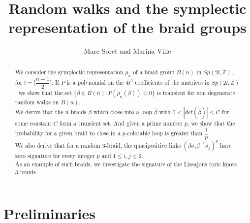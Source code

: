 \documentclass[12pt]{article}
\begin{document}
\newtheorem{defn}{Definition}
\newtheorem{fact}{Fact}
\newtheorem{thm}{Theorem}
\newtheorem{prop}{Proposition}
\newtheorem{lem}{Lemma}
\newtheorem{conj}{Conjecture}
\newtheorem{slem}{Sublemma}
\newtheorem{cor}{Corollary}
\newtheorem{ass}{Assumption}
\newtheorem{ques}{Question}
\newtheorem*{mlem*}{Main Lemma}

\newcommand{\newconstant}[2]{\refstepcounter{constant}\label{#1}}
\newcommand{\useconstant}[2]{C_{\ref{#1}}}
\title{Random walks and the symplectic representation of the braid groups}
\author{Marc Soret and Marina Ville}
\maketitle
\begin{abstract} We consider the symplectic representation $\rho_n$ of a braid group $B(n)$ in $Sp(2l,\mathbb{Z})$, for $l=\Big[\dfrac{n-1}{2}\Big]$. If $P$ is a  polynomial on the $4l^2$ coefficients of the matrices in $Sp(2l,\mathbb{Z})$, we show that the set $\{\beta\in B(n): P(\rho_n(\beta))=0\}$ is transient for non degenerate random walks on $B(n)$. \\
	We derive that the $n$-braids $\beta$ which close into a loop $\hat{\beta}$ with  $0<|det({\hat{\beta}})|\leq C$ for some constant $C$ form a transient set. And given a prime number $p$, we show that the probability for a given braid to close in a $p$-colorable loop is greater than $\dfrac{1}{p}$. \\
	We also derive that for a random $3$-braid,  the quasipositive links $(\beta\sigma_i\beta^{-1}\sigma_j)^p$ have zero signature for every integer $p$ and $1\leq i,j\leq 2$. \\ As an example of such braids, we investigate the signature of the  Lissajous toric knots $3$-braids. 
	
	
\end{abstract}
\section{Preliminaries}
\end{document}
